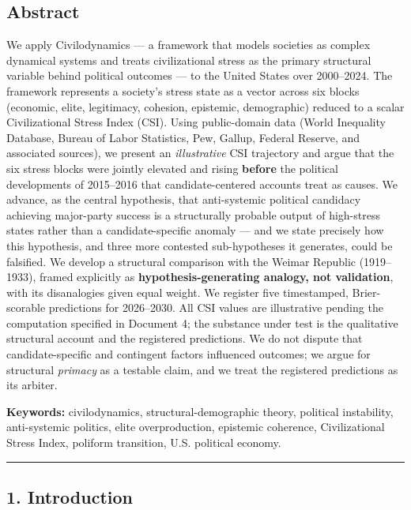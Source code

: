 \documentclass[
]{article}
\begin{document}
\subsection{Abstract}\label{abstract}

We apply Civilodynamics --- a framework that models societies as complex
dynamical systems and treats civilizational stress as the primary
structural variable behind political outcomes --- to the United States
over 2000--2024. The framework represents a society's stress state as a
vector across six blocks (economic, elite, legitimacy, cohesion,
epistemic, demographic) reduced to a scalar Civilizational Stress Index
(CSI). Using public-domain data (World Inequality Database, Bureau of
Labor Statistics, Pew, Gallup, Federal Reserve, and associated sources),
we present an \emph{illustrative} CSI trajectory and argue that the six
stress blocks were jointly elevated and rising \textbf{before} the
political developments of 2015--2016 that candidate-centered accounts
treat as causes. We advance, as the central hypothesis, that
anti-systemic political candidacy achieving major-party success is a
structurally probable output of high-stress states rather than a
candidate-specific anomaly --- and we state precisely how this
hypothesis, and three more contested sub-hypotheses it generates, could
be falsified. We develop a structural comparison with the Weimar
Republic (1919--1933), framed explicitly as
\textbf{hypothesis-generating analogy, not validation}, with its
disanalogies given equal weight. We register five timestamped,
Brier-scorable predictions for 2026--2030. All CSI values are
illustrative pending the computation specified in Document 4; the
substance under test is the qualitative structural account and the
registered predictions. We do not dispute that candidate-specific and
contingent factors influenced outcomes; we argue for structural
\emph{primacy} as a testable claim, and we treat the registered
predictions as its arbiter.

\textbf{Keywords:} civilodynamics, structural-demographic theory,
political instability, anti-systemic politics, elite overproduction,
epistemic coherence, Civilizational Stress Index, poliform transition,
U.S. political economy.

\begin{center}\rule{0.5\linewidth}{0.5pt}\end{center}

\subsection{1. Introduction}\label{introduction}
\end{document}
